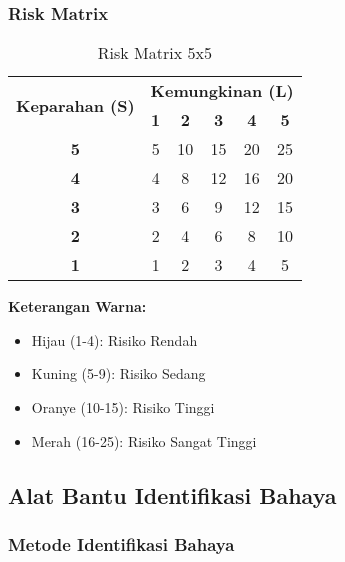 \vspace{0.5cm}

\subsubsection{Risk Matrix}

\begin{table}[h]
\centering
\begin{tabular}{|c|c|c|c|c|c|}
\hline
\multirow{2}{*}{\textbf{Keparahan (S)}} & \multicolumn{5}{c|}{\textbf{Kemungkinan (L)}} \\
\cline{2-6}
 & \textbf{1} & \textbf{2} & \textbf{3} & \textbf{4} & \textbf{5} \\
\hline
\textbf{5} & 5 & 10 & 15 & 20 & 25 \\
\hline
\textbf{4} & 4 & 8 & 12 & 16 & 20 \\
\hline
\textbf{3} & 3 & 6 & 9 & 12 & 15 \\
\hline
\textbf{2} & 2 & 4 & 6 & 8 & 10 \\
\hline
\textbf{1} & 1 & 2 & 3 & 4 & 5 \\
\hline
\end{tabular}
\caption{Risk Matrix 5x5}
\label{tab:risk-matrix}
\end{table}

\textbf{Keterangan Warna:}
\begin{itemize}
    \item Hijau (1-4): Risiko Rendah
    \item Kuning (5-9): Risiko Sedang
    \item Oranye (10-15): Risiko Tinggi
    \item Merah (16-25): Risiko Sangat Tinggi
\end{itemize}

\vspace{1cm}

\subsection{Alat Bantu Identifikasi Bahaya}
\label{subsec:alat-bantu}


\subsubsection{Metode Identifikasi Bahaya}

